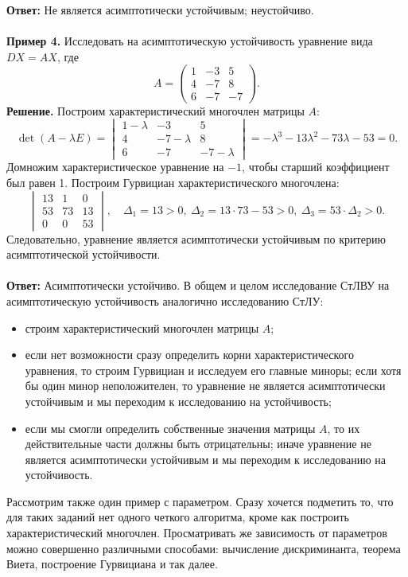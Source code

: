 \documentclass[a4paper, 12pt]{article}
\begin{document}
\textbf{Ответ:} Не является асимптотически устойчивым; неустойчиво.\\\\
\textbf{Пример 4.} Исследовать на асимптотическую устойчивость уравнение  вида $DX = AX$, где $$A = \begin{pmatrix}
	1 & -3 & 5\\
	4 & -7 & 8\\
	6 & -7 & -7
\end{pmatrix}.$$
\textbf{Решение.} Построим характеристический многочлен матрицы $A$:
$$\det(A-\lambda E) = \begin{vmatrix}
	1-\lambda & -3 & 5\\
	4 & -7-\lambda & 8\\
	6 & -7 & -7-\lambda
\end{vmatrix} = -\lambda^3-13\lambda^2-73\lambda-53 = 0.$$
Домножим характеристическое уравнение на $-1$, чтобы старший коэффициент был равен 1. Построим Гурвициан характеристического многочлена:
$$\begin{vmatrix}
	13 & 1 & 0\\
	53 & 73 & 13\\
	0 & 0 & 53
\end{vmatrix},\quad \Delta_1 = 13 > 0,\ \Delta_2 = 13\cdot 73 -53 > 0,\ \Delta_3 = 53\cdot\Delta_2 > 0.$$
Следовательно, уравнение является асимптотически устойчивым по критерию асимптотической устойчивости.\\\\
\textbf{Ответ:} Асимптотически устойчиво.
В общем и целом исследование СтЛВУ на асимптотическую устойчивость аналогично исследованию СтЛУ:\begin{itemize}
	\item строим характеристический многочлен матрицы $A$;
	\item если нет возможности сразу определить корни характеристического уравнения, то строим Гурвициан и исследуем его главные миноры; если хотя бы один минор неположителен, то уравнение не является асимптотически устойчивым и мы переходим к исследованию на устойчивость;
	\item если мы смогли определить собственные значения матрицы $A$, то их действительные части должны быть отрицательны; иначе уравнение не является асимптотически устойчивым и мы переходим к исследованию на устойчивость.
\end{itemize}
Рассмотрим также один пример с параметром. Сразу хочется подметить то, что для таких заданий нет одного четкого алгоритма, кроме как построить характеристический многочлен. Просматривать же зависимость от параметров можно совершенно различными способами: вычисление дискриминанта, теорема Виета, построение Гурвициана и так далее.\\\\
\end{document}
